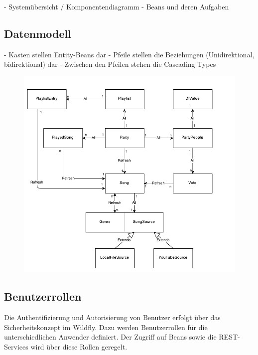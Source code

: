 
- Systemübersicht / Komponentendiagramm
- Beans und deren Aufgaben


\subsection{Datenmodell}


- Kasten stellen Entity-Beans dar
- Pfeile stellen die Beziehungen (Unidirektional, bidirektional) dar
- Zwischen den Pfeilen stehen die Cascading Types

\begin{figure}[H]
\centering
\includegraphics[width=1\linewidth]{Bilder/EntityBeansModelMitCascading}
\caption{}
\label{fig:EntityBeansModelMitCascading}
\end{figure}


\subsection{Benutzerrollen}
Die Authentifizierung und Autorisierung von Benutzer erfolgt über das Sicherheitskonzept im Wildfly. Dazu werden Benutzerrollen für die unterschiedlichen Anwender definiert. Der Zugriff auf Beans sowie die REST-Services wird über diese Rollen geregelt. 

